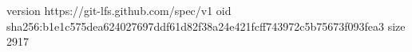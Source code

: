 version https://git-lfs.github.com/spec/v1
oid sha256:b1e1c575dea624027697ddf61d82f38a24e421fcff743972c5b75673f093fea3
size 2917
